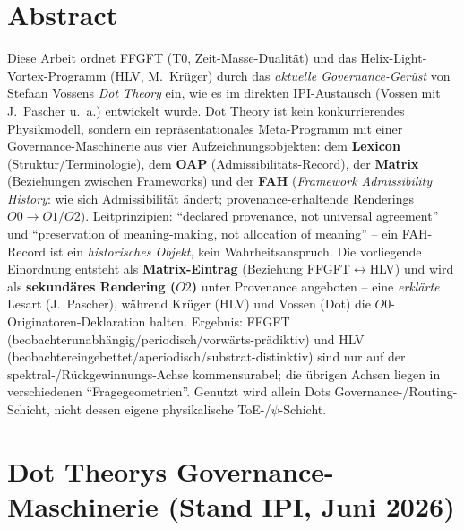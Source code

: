 
\section*{Abstract}
Diese Arbeit ordnet FFGFT (T0, Zeit-Masse-Dualität) und das Helix-Light-Vortex-Programm
(HLV, M.~Krüger) durch das \emph{aktuelle Governance-Gerüst} von Stefaan Vossens \emph{Dot Theory}
ein, wie es im direkten IPI-Austausch (Vossen mit J.~Pascher u.~a.) entwickelt wurde. Dot Theory ist
kein konkurrierendes Physikmodell, sondern ein repräsentationales Meta-Programm mit einer
Governance-Maschinerie aus vier Aufzeichnungsobjekten: dem \textbf{Lexicon} (Struktur/Terminologie),
dem \textbf{OAP} (Admissibilitäts-Record), der \textbf{Matrix} (Beziehungen zwischen Frameworks) und
der \textbf{FAH} (\emph{Framework Admissibility History}: wie sich Admissibilität ändert;
provenance-erhaltende Renderings $O0 \to O1/O2$). Leitprinzipien: \enquote{declared provenance, not
universal agreement} und \enquote{preservation of meaning-making, not allocation of meaning} -- ein
FAH-Record ist ein \emph{historisches Objekt}, kein Wahrheitsanspruch. Die vorliegende Einordnung
entsteht als \textbf{Matrix-Eintrag} (Beziehung FFGFT$\leftrightarrow$HLV) und wird als
\textbf{sekundäres Rendering ($O2$)} unter Provenance angeboten -- eine \emph{erklärte} Lesart
(J.~Pascher), während Krüger (HLV) und Vossen (Dot) die $O0$-Originatoren-Deklaration halten.
Ergebnis: FFGFT (beobachterunabhängig/periodisch/vorwärts-prädiktiv) und HLV
(beobachtereingebettet/aperiodisch/substrat-distinktiv) sind nur auf der spektral-/Rückgewinnungs-Achse
kommensurabel; die übrigen Achsen liegen in verschiedenen \enquote{Fragegeometrien}. Genutzt wird allein
Dots Governance-/Routing-Schicht, nicht dessen eigene physikalische ToE-/$\psi$-Schicht.

\section{Dot Theorys Governance-Maschinerie (Stand IPI, Juni 2026)}

